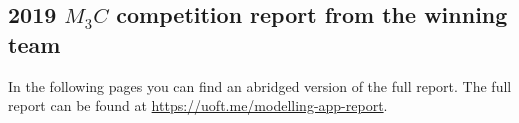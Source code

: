 \subsection{2019 $M_3C$ competition report from the winning team}
\label{2019M3C}

%

\begin{minipage}{.7\textwidth}
In the following pages you can find an abridged version of the full report. The full report can be found at \url{https://uoft.me/modelling-app-report}.	
\end{minipage}
\hfill
\begin{minipage}{.25\textwidth}
\end{minipage}


	\vfil

	\hfil {}

